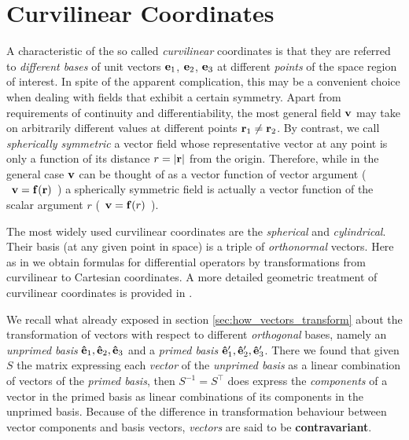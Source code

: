 \section{Curvilinear Coordinates}
A characteristic of the so called \textit{curvilinear} coordinates is that they are referred to \textit{different bases} of unit vectors $\vb{e}_1$, $\vb{e}_2$, $\vb{e}_3$ at different \textit{points} of the space region of interest. In spite of the apparent complication, this may be a convenient choice when dealing with fields that exhibit a certain symmetry. Apart from requirements of continuity and differentiability, the most general field $\vb{v}$ may take on arbitrarily different values at different points $\vb{r}_1 \neq \vb{r}_2$.  By contrast, we call \textit{spherically symmetric} a vector field whose representative vector at any point is only a function of its distance $r = \abs{\vb{r}}$ from the origin. Therefore, while in the general case $\vb{v}$ can be thought of as a vector function of vector argument ($\:\:\vb{v} = \vb{f}(\vb{r})\:\:$) a spherically symmetric field is actually a vector function of the scalar argument $r$   ($\:\:\vb{v} = \vb{f}(r)\:\:$). 

The most widely used curvilinear coordinates are the  \textit{spherical} and \textit{cylindrical}. Their basis (at any given point in space) is a triple of \textit{orthonormal} vectors. Here as in \cite{Griffiths_4th} we obtain formulas for differential operators by transformations from curvilinear to Cartesian coordinates. A more detailed geometric treatment of curvilinear coordinates is provided in \cite{BudakFomin_1973}.  

We recall what already exposed in section \ref{sec:how_vectors_transform} about the transformation of vectors with respect to different \textit{orthogonal} bases, namely an \textit{unprimed basis} $\vu{e}_1, \vu{e}_2, \vu{e}_3$ and a \textit{primed basis} ${\vu{e}_1}',{\vu{e}_2}', {\vu{e}_3}'$. There we found that given $S$ the matrix expressing each \textit{vector} of the \textit{unprimed basis} as a linear combination of vectors of the  \textit{primed basis}, then $S^{-1}=S^{\top}$ does express the \textit{components} of a vector in the primed basis as linear combinations of its components in the unprimed basis. Because of the difference in transformation behaviour between vector components and basis vectors, \textit{vectors} are said to be \textbf{contravariant}.

